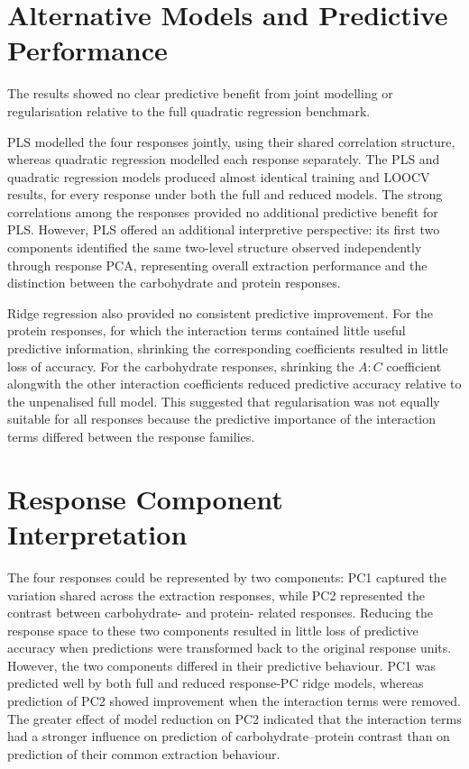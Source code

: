 \documentclass[MScDSA]{uccthesis}
\begin{document}
\section{Alternative Models and Predictive Performance}
The results showed no clear predictive benefit from joint modelling or regularisation relative to the full quadratic regression benchmark.

PLS modelled the four responses jointly, using their shared correlation structure, whereas quadratic regression modelled each response separately. The PLS and quadratic regression models produced almost identical training and LOOCV results, for every response under both the full and reduced models. The strong correlations among the responses provided no additional predictive benefit for PLS. However, PLS offered an additional interpretive perspective: its first two components identified the same two-level structure observed independently through response PCA, representing overall extraction performance and the distinction between the carbohydrate and protein responses.

Ridge regression also provided no consistent predictive improvement. For the protein responses, for which the interaction terms contained little useful predictive information, shrinking the corresponding coefficients resulted in little loss of accuracy. For the carbohydrate responses, shrinking the $A:C$ coefficient alongwith the other interaction coefficients reduced predictive accuracy relative to the unpenalised full model. This suggested that regularisation was not equally suitable for all responses because the predictive importance of the interaction terms differed between the response families.

\section{Response Component Interpretation}
The four responses could be represented by two components: PC1 captured the variation shared across the extraction responses, while PC2 represented the contrast between carbohydrate- and protein- related responses. Reducing the response space to these two components resulted in little loss of predictive accuracy when predictions were transformed back to the original response units. However, the two components differed in their predictive behaviour. PC1 was predicted well by both full and reduced response-PC ridge models, whereas prediction of PC2 showed improvement when the interaction terms were removed. The greater effect of model reduction on PC2 indicated that the interaction terms had a stronger influence on prediction of carbohydrate--protein contrast than on prediction of their common extraction behaviour. 
\end{document}

